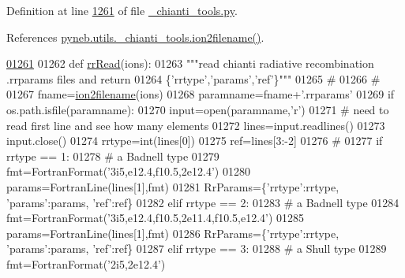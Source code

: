 Definition at line \hyperlink{__chianti__tools_8py_source_l01261}{1261} of file \hyperlink{__chianti__tools_8py_source}{\-\_\-chianti\-\_\-tools.\-py}.



References \hyperlink{__chianti__tools_8py_source_l00396}{pyneb.\-utils.\-\_\-chianti\-\_\-tools.\-ion2filename()}.


\begin{DoxyCode}
\hypertarget{namespacepyneb_1_1utils_1_1__chianti__tools_l01261}{}\hyperlink{namespacepyneb_1_1utils_1_1__chianti__tools_aaa4f9748029dedf2b12af0c6d8f765c7}{01261} 
01262 \textcolor{keyword}{def }\hyperlink{namespacepyneb_1_1utils_1_1__chianti__tools_aaa4f9748029dedf2b12af0c6d8f765c7}{rrRead}(ions):
01263     \textcolor{stringliteral}{"""read chianti radiative recombination .rrparams files and return}
01264 \textcolor{stringliteral}{        \{'rrtype','params','ref'\}"""}
01265     \textcolor{comment}{#}
01266     \textcolor{comment}{#}
01267     fname=\hyperlink{namespacepyneb_1_1utils_1_1__chianti__tools_a7748521ca99103785680d691667ce851}{ion2filename}(ions)
01268     paramname=fname+\textcolor{stringliteral}{'.rrparams'}
01269     \textcolor{keywordflow}{if} os.path.isfile(paramname):
01270         input=open(paramname,\textcolor{stringliteral}{'}\textcolor{stringliteral}{r')}
01271 \textcolor{stringliteral}{        }\textcolor{comment}{#  need to read first line and see how many elements}
01272         lines=input.readlines()
01273         input.close()
01274         rrtype=int(lines[0])
01275         ref=lines[3:-2]
01276         \textcolor{comment}{#}
01277         \textcolor{keywordflow}{if} rrtype == 1:
01278             \textcolor{comment}{# a Badnell type}
01279             fmt=FortranFormat(\textcolor{stringliteral}{'3i5,e12.4,f10.5,2e12.4'})
01280             params=FortranLine(lines[1],fmt)
01281             RrParams=\{\textcolor{stringliteral}{'rrtype'}:rrtype, \textcolor{stringliteral}{'params'}:params, \textcolor{stringliteral}{'ref'}:ref\}
01282         \textcolor{keywordflow}{elif} rrtype == 2:
01283             \textcolor{comment}{# a Badnell type}
01284             fmt=FortranFormat(\textcolor{stringliteral}{'3i5,e12.4,f10.5,2e11.4,f10.5,e12.4'})
01285             params=FortranLine(lines[1],fmt)
01286             RrParams=\{\textcolor{stringliteral}{'rrtype'}:rrtype, \textcolor{stringliteral}{'params'}:params, \textcolor{stringliteral}{'ref'}:ref\}
01287         \textcolor{keywordflow}{elif} rrtype == 3:
01288             \textcolor{comment}{# a Shull type}
01289             fmt=FortranFormat(\textcolor{stringliteral}{'2i5,2e12.4'})

\end{DoxyCode}
